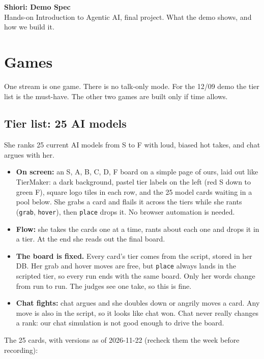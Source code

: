 \documentclass[11pt,a4paper]{article}
\begin{document}
\begin{center}
{\Large\bfseries Shiori: Demo Spec}\\[0.4ex]
{\small Hands-on Introduction to Agentic AI, final project. What the demo shows, and how we build it.}
\end{center}

\section{Games}
One stream is one game. There is no talk-only mode. For the 12/09 demo the tier list is the must-have. The other two games are built only if time allows.

\subsection{Tier list: 25 AI models}
She ranks 25 current AI models from S to F with loud, biased hot takes, and chat argues with her.
\begin{itemize}
\item \textbf{On screen:} an S, A, B, C, D, F board on a simple page of ours, laid out like TierMaker: a dark background, pastel tier labels on the left (red S down to green F), square logo tiles in each row, and the 25 model cards waiting in a pool below. She grabs a card and flails it across the tiers while she rants (\texttt{grab}, \texttt{hover}), then \texttt{place} drops it. No browser automation is needed.
\item \textbf{Flow:} she takes the cards one at a time, rants about each one and drops it in a tier. At the end she reads out the final board.
\item \textbf{The board is fixed.} Every card's tier comes from the script, stored in her DB. Her grab and hover moves are free, but \texttt{place} always lands in the scripted tier, so every run ends with the same board. Only her words change from run to run. The judges see one take, so this is fine.
\item \textbf{Chat fights:} chat argues and she doubles down or angrily moves a card. Any move is also in the script, so it looks like chat won. Chat never really changes a rank: our chat simulation is not good enough to drive the board.
\end{itemize}
The 25 cards, with versions as of 2026-11-22 (recheck them the week before recording):
\end{document}
